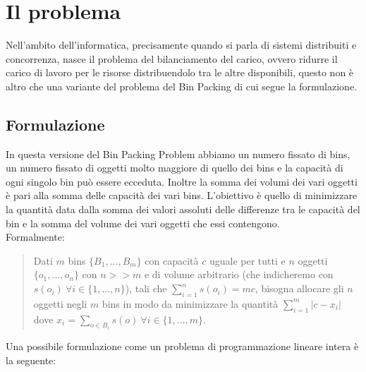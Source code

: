 \section{Il problema}
Nell'ambito dell'informatica, precisamente quando si parla di sistemi distribuiti e concorrenza, nasce il problema
del bilanciamento del carico, ovvero ridurre il carico di lavoro per le risorse distribuendolo tra le altre disponibili, questo 
non è altro che una variante del problema del Bin Packing di cui segue la formulazione.

\subsection{Formulazione}
In questa versione del Bin Packing Problem abbiamo un numero fissato di bins, un numero fissato di oggetti molto maggiore di 
quello dei bins e la capacità di ogni singolo bin può essere ecceduta. Inoltre la somma dei volumi dei vari oggetti è pari alla 
somma delle capacità dei vari bins. L'obiettivo è quello di minimizzare la quantità data dalla somma dei valori assoluti delle 
differenze tra le capacità del bin e la somma del volume dei vari oggetti che essi contengono. \\
Formalmente:
\begin{quote}
	Dati $ m $ bins $ \{B_1, ..., B_m\} $ con capacità $ c $ uguale per tutti e $ n $ oggetti $ \{o_1, ..., o_n\} $ con $ n >> m $ e di volume
	arbitrario (che indicheremo con $ s(o_i) \: \forall i \in \{1, ..., n\} $), tali che $ \displaystyle\sum\limits_{i=1}^{n} s(o_i) = mc $,
	bisogna allocare gli $ n $ oggetti negli $ m $ bins in modo da minimizzare la quantità $ \displaystyle\sum\limits_{i=1}^{m} |c - x_i| $
	dove $ x_i = \displaystyle\sum\limits_{o \in B_i} s(o) \: \forall i \in \{1, ..., m\} $.
\end{quote}
Una possibile formulazione come un problema di programmazione lineare intera è la seguente:
